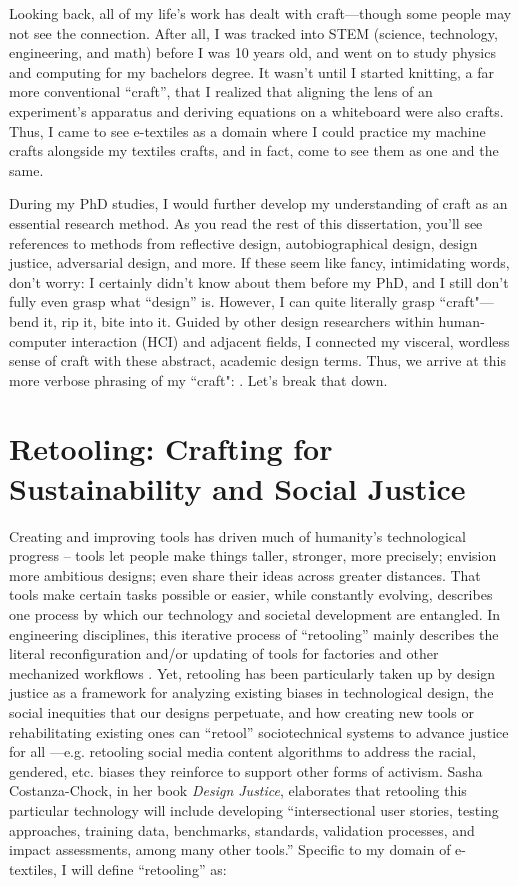 Looking back, all of my life's work has dealt with craft---though some people may not see the connection. After all, I was tracked into STEM (science, technology, engineering, and math) before I was 10 years old, and went on to study physics and computing for my bachelors degree. It wasn't until I started knitting, a far more conventional ``craft'', that I realized that aligning the lens of an experiment's apparatus and deriving equations on a whiteboard were also crafts. Thus, I came to see e-textiles as a domain where I could practice my machine crafts alongside my textiles crafts, and in fact, come to see them as one and the same.

During my PhD studies, I would further develop my understanding of craft as an essential research method. As you read the rest of this dissertation, you'll see references to methods from reflective design, autobiographical design, design justice, adversarial design, and more. If these seem like fancy, intimidating words, don't worry: I certainly didn't know about them before my PhD, and I still don't fully even grasp what ``design'' is. However, I can quite literally grasp ``craft"---bend it, rip it, bite into it. Guided by other design researchers within human-computer interaction (HCI) and adjacent fields, I connected my visceral, wordless sense of craft with these abstract, academic design terms. Thus, we arrive at this more verbose phrasing of my ``craft": . Let's break that down.

\section{Retooling: Crafting for Sustainability and Social Justice}

Creating and improving tools has driven much of humanity's technological progress -- tools let people make things taller, stronger, more precisely; envision more ambitious designs; even share their ideas across greater distances. That tools make certain tasks possible or easier, while constantly evolving, describes one process by which our technology and societal development are entangled. In engineering disciplines, this iterative process of ``retooling'' mainly describes the literal reconfiguration and/or updating of tools for factories and other mechanized workflows \cite{merriam-webster_retool_2023}. Yet, retooling has been particularly taken up by design justice as a framework for analyzing existing biases in technological design, the social inequities that our designs perpetuate, and how creating new tools or rehabilitating existing ones can ``retool'' sociotechnical systems to advance justice for all \cite{costanza-chock_design_2020}---e.g. retooling social media content algorithms to address the racial, gendered, etc. biases they reinforce to support other forms of activism. Sasha Costanza-Chock, in her book \textit{Design Justice}, elaborates that retooling this particular technology will include developing ``intersectional user stories, testing approaches, training data, benchmarks, standards, validation processes, and impact assessments, among many other tools.'' Specific to my domain of e-textiles, I will define ``retooling'' as:

